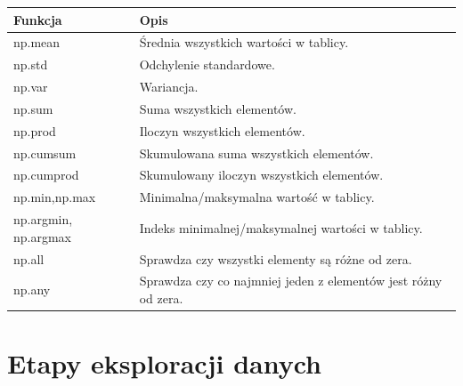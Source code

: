 \documentclass[
  letterpaper,
  DIV=11,
  numbers=noendperiod]{scrreprt}
\begin{document}
\begin{longtable}[]{@{}
  >{\raggedright\arraybackslash}p{}
  >{\raggedright\arraybackslash}p{}@{}}
\toprule\noalign{}
\begin{minipage}[b]{\linewidth}\raggedright
Funkcja
\end{minipage} & \begin{minipage}[b]{\linewidth}\raggedright
Opis
\end{minipage} \\
\midrule\noalign{}
\endhead
\bottomrule\noalign{}
\endlastfoot
np.mean & Średnia wszystkich wartości w tablicy. \\
np.std & Odchylenie standardowe. \\
np.var & Wariancja. \\
np.sum & Suma wszystkich elementów. \\
np.prod & Iloczyn wszystkich elementów. \\
np.cumsum & Skumulowana suma wszystkich elementów. \\
np.cumprod & Skumulowany iloczyn wszystkich elementów. \\
np.min,np.max & Minimalna/maksymalna wartość w tablicy. \\
np.argmin, np.argmax & Indeks minimalnej/maksymalnej wartości w
tablicy. \\
np.all & Sprawdza czy wszystki elementy są różne od zera. \\
np.any & Sprawdza czy co najmniej jeden z elementów jest różny od
zera. \\
\end{longtable}


\chapter{Etapy eksploracji danych}\label{etapy-eksploracji-danych}
\end{document}
